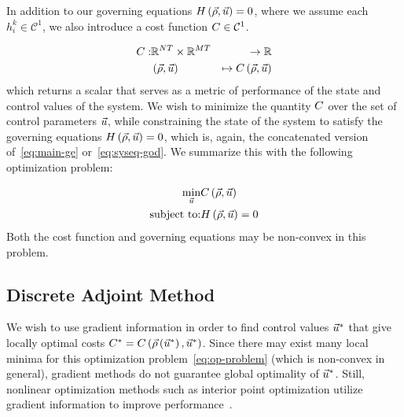 In addition to our governing equations $H\left(\vec{\rho},\vec{u}\right)=0$, where we assume each $h_i^k \in \mathcal{C}^1$,
we also introduce a cost function $C \in \mathcal{C}^1$.

\begin{eqnarray*}
C: & \mathbb{R}^{N T}\times\mathbb{R}^{M T} & \rightarrow\mathbb{R}\\
& \left(\vec{\rho},\vec{u}\right) & \mapsto C\left(\vec{\rho},\vec{u}\right)
\end{eqnarray*}
which returns a scalar that serves as a metric of performance of the
state and control values of the system. We wish to minimize the quantity
$C$ over the set of control parameters $\vec{u}$, while constraining
the state of the system to satisfy the governing equations $H\left(\vec{\rho},\vec{u}\right)=0$,
which is, again, the concatenated version of~\eqref{eq:main-ge} or~\eqref{eq:syseq-god}.
We summarize this with the following optimization problem:

\begin{eqnarray}
\underset{\vec{u}}{\min} & C\left(\vec{\rho},\vec{u}\right)\nonumber \\
\text{subject to:} & H\left(\vec{\rho},\vec{u}\right)=0\label{eq:op-problem}
\end{eqnarray}
Both the cost function and governing equations may be non-convex in
this problem.


\subsection{Discrete Adjoint Method}
\label{sec:discrete-adjoint-method}

We wish to use gradient information in order to find control values
$\vec{u}^{*}$ that give locally optimal costs $C^{*}=C\left(\vec{\rho}\left(\vec{u}^{*}\right),\vec{u}^{*}\right)$.
Since there may exist many local minima for this optimization problem~\eqref{eq:op-problem}
(which is non-convex in general), gradient\emph{ }methods do not guarantee
global optimality of $\vec{u}^{*}$\emph{. }Still, nonlinear optimization
methods such as interior point optimization utilize gradient information
to improve performance~\cite{Andreas2005}.

